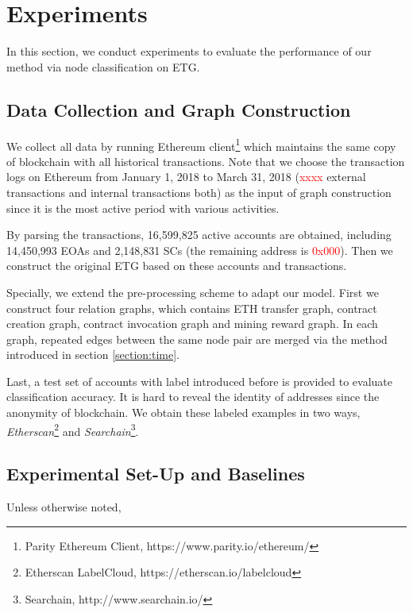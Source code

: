 
\section{Experiments}
In this section, we conduct experiments to evaluate the performance of our method via node classification on ETG.

\subsection{Data Collection and Graph Construction}
We collect all data by running Ethereum client\footnote{Parity Ethereum Client, https://www.parity.io/ethereum/} which maintains the same copy of blockchain with all historical transactions. Note that we choose the transaction logs on Ethereum from January 1, 2018 to March 31, 2018 (\textcolor{red}{xxxx} external transactions and internal transactions both) as the input of graph construction since it is the most active period with various activities.

By parsing the transactions, 16,599,825 active accounts are obtained, including 14,450,993 EOAs and 2,148,831 SCs (the remaining address is \textcolor{red}{0x000}). Then we construct the original ETG based on these accounts and transactions.

Specially, we extend the pre-processing scheme to adapt our model. First we construct four relation graphs, which contains ETH transfer graph, contract creation graph, contract invocation graph and mining reward graph. In each graph, repeated edges between the same node pair are merged via the method introduced in section \ref{section:time}.

Last, a test set of accounts with label introduced before is provided to evaluate classification accuracy. It is hard to reveal the identity of addresses since the anonymity of blockchain. We obtain these labeled examples in two ways, \emph{Etherscan}\footnote{Etherscan LabelCloud, https://etherscan.io/labelcloud} and \emph{Searchain}\footnote{Searchain, http://www.searchain.io/}.




\subsection{Experimental Set-Up and Baselines}
Unless otherwise noted,

